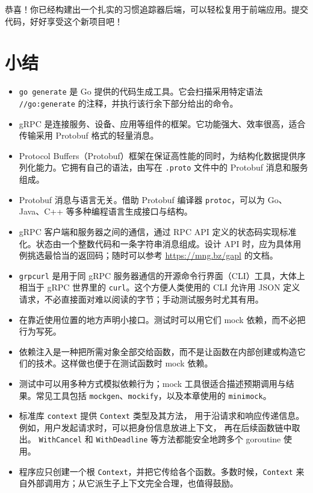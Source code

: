 恭喜！你已经构建出一个扎实的习惯追踪器后端，可以轻松复用于前端应用。提交代码，好好享受这个新项目吧！

\section*{小结}

\begin{itemize}
  \item \texttt{go generate} 是 Go 提供的代码生成工具。它会扫描采用特定语法 \texttt{//go:generate} 的注释，并执行该行余下部分给出的命令。
  \item gRPC 是连接服务、设备、应用等组件的框架。它功能强大、效率很高，适合传输采用 Protobuf 格式的轻量消息。
  \item Protocol Buffers（Protobuf）框架在保证高性能的同时，为结构化数据提供序列化能力。它拥有自己的语法，由写在 \texttt{.proto} 文件中的 Protobuf 消息和服务组成。
  \item Protobuf 消息与语言无关。借助 Protobuf 编译器 \texttt{protoc}，可以为 Go、Java、C++ 等多种编程语言生成接口与结构。
  \item gRPC 客户端和服务器之间的通信，通过 RPC API 定义的状态码实现标准化。状态由一个整数代码和一条字符串消息组成。设计 API 时，应为具体用例挑选最恰当的返回码；随时可以参考 \url{https://mng.bz/gapl} 的文档。
  \item \texttt{grpcurl} 是用于同 gRPC 服务器通信的开源命令行界面（CLI）工具，大体上相当于 gRPC 世界里的 \texttt{curl}。这个方便人类使用的 CLI 允许用 JSON 定义请求，不必直接面对难以阅读的字节；手动测试服务时尤其有用。
  \item 在靠近使用位置的地方声明小接口。测试时可以用它们 mock 依赖，而不必把行为写死。
  \item 依赖注入是一种把所需对象全部交给函数，而不是让函数在内部创建或构造它们的技术。这样做也便于在测试函数时 mock 依赖。
  \item 测试中可以用多种方式模拟依赖行为；mock 工具很适合描述预期调用与结果。常见工具包括 \texttt{mockgen}、\texttt{mockify}，以及本章使用的 \texttt{minimock}。
  \item 标准库 \texttt{context} 提供 \texttt{Context} 类型及其方法，
  用于沿请求和响应传递信息。例如，用户发起请求时，可以把身份信息放进上下文，
  再在后续函数链中取出。\newline
  \texttt{WithCancel} 和 \texttt{WithDeadline} 等方法都能安全地跨多个 goroutine 使用。
  \item 程序应只创建一个根 \texttt{Context}，并把它传给各个函数。多数时候，\texttt{Context} 来自外部调用方；从它派生子上下文完全合理，也值得鼓励。

\end{itemize}
